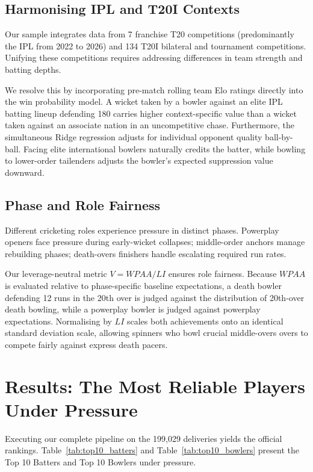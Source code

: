 \documentclass[11pt,a4paper]{article}
\begin{document}
\subsection{Harmonising IPL and T20I Contexts}
Our sample integrates data from 7 franchise T20 competitions (predominantly the IPL from 2022 to 2026) and 134 T20I bilateral and tournament competitions. Unifying these competitions requires addressing differences in team strength and batting depths.

We resolve this by incorporating pre-match rolling team Elo ratings directly into the win probability model. A wicket taken by a bowler against an elite IPL batting lineup defending 180 carries higher context-specific value than a wicket taken against an associate nation in an uncompetitive chase. Furthermore, the simultaneous Ridge regression adjusts for individual opponent quality ball-by-ball. Facing elite international bowlers naturally credits the batter, while bowling to lower-order tailenders adjusts the bowler's expected suppression value downward.

\subsection{Phase and Role Fairness}
Different cricketing roles experience pressure in distinct phases. Powerplay openers face pressure during early-wicket collapses; middle-order anchors manage rebuilding phases; death-overs finishers handle escalating required run rates.

Our leverage-neutral metric $V = WPAA / LI$ ensures role fairness. Because $WPAA$ is evaluated relative to phase-specific baseline expectations, a death bowler defending 12 runs in the 20th over is judged against the distribution of 20th-over death bowling, while a powerplay bowler is judged against powerplay expectations. Normalising by $LI$ scales both achievements onto an identical standard deviation scale, allowing spinners who bowl crucial middle-overs overs to compete fairly against express death pacers.

\section{Results: The Most Reliable Players Under Pressure}
\label{sec:results}

Executing our complete pipeline on the 199,029 deliveries yields the official rankings. Table~\ref{tab:top10_batters} and Table~\ref{tab:top10_bowlers} present the Top 10 Batters and Top 10 Bowlers under pressure.
\end{document}
